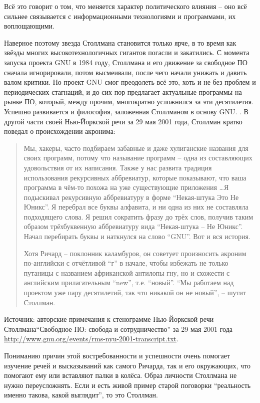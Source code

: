 Всё это говорит о том, что меняется характер политического влияния -- оно всё сильнее связывается с информационными технологиями и программами, их воплощающими. 

Наверное поэтому звезда Столлмана становится только ярче, в то время как звёзды многих высокотехнологичных гигантов погасли и закатились. С момента запуска проекта GNU в 1984 году, Столлмана и его движение за свободное ПО сначала игнорировали, потом высмеивали, после чего начали унижать и давить валом критики. Но проект GNU смог преодолеть всё это, хоть и не без проблем и периодических стагнаций, и до сих пор предлагает актуальные программы на рынке ПО, который, между прочим, многократно усложнился за эти десятилетия. Успешно развивается и философия, заложенная Столлманом в основу GNU. . В другой части своей Нью-Йоркской речи за 29 мая 2001 года, Столлман кратко поведал о происхождении акронима:

\begin{quote}
Мы, хакеры, часто подбираем забавные и даже хулиганские названия для своих программ, потому что называние программ -- одна из составляющих удовольствия от их написания. Также у нас развита традиция использования рекурсивных аббревиатур, которые показывают, что ваша программа в чём-то похожа на уже существующие приложения \ldots Я подыскивал рекурсивную аббревиатуру в форме ``Некая-штука Это Не Юникс''. Я перебрал все буквы алфавита, и ни одна из них не составляла подходящего слова. Я решил сократить фразу до трёх слов, получив таким образом трёхбуквенную аббревиатуру вида ``Некая-штука -- Не Юникс''. Начал перебирать буквы и наткнулся на слово ``GNU''. Вот и вся история.

Хотя Ричард -- поклонник каламбуров, он советует произносить акроним по-английски с отчётливой ``г'' в начале, чтобы избежать не только путаницы с названием африканской антилопы гну, но и схожести с английским прилагательным ``new'', т.е. ``новый''. ``Мы работаем над проектом уже пару десятилетий, так что никакой он не новый'', -- шутит Столлман.
\end{quote}

Источник: авторские примечания к стенограмме Нью-Йоркской речи Столлмана``Свободное ПО: свобода и сотрудничество'' за 29 мая 2001 года \url{http://www.gnu.org/events/rms-nyu-2001-transcript.txt}.

Пониманию причин этой востребованности и успешности очень помогает изучение речей и высказываний как самого Ричарда, так и его окружающих, что помогают ему или вставляют палки в колёса. Образ личности Столлмана не нужно переусложнять. Если и есть живой пример старой поговорки ``реальность именно такова, какой выглядит'', то это Столлман.

